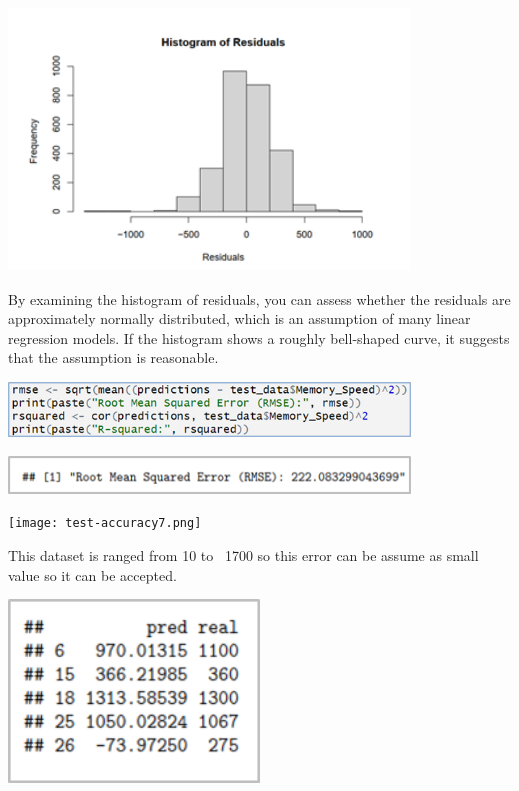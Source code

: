 \begin{center}
    \includegraphics[width=0.8\textwidth]{test-accuracy4.png}
\end{center}

\tab  By examining the histogram of residuals, you can assess 
whether the residuals are approximately normally distributed, 
which is an assumption of many linear regression models. If the histogram shows a roughly bell-shaped curve, it suggests that the assumption is reasonable.  

\begin{center}
    \includegraphics[width=0.8\textwidth]{test-accuracy5.png}
\end{center}

\begin{center}
    \includegraphics[width=0.8\textwidth]{test-accuracy6.png}
\end{center}

\begin{center}
    \texttt{[image: test-accuracy7.png]}
\end{center}

\tab This dataset is ranged from 10 to ~1700 so this error can be assume as small value so it can be accepted. 

\begin{center}
    \includegraphics[width=0.5\textwidth]{test-accuracy8.png}
\end{center}

